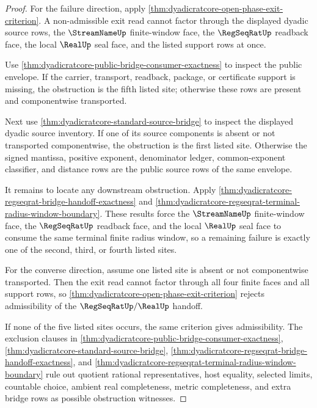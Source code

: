 \begin{proof}
For the failure direction, apply
\autoref{thm:dyadicratcore-open-phase-exit-criterion}. A non-admissible exit
read cannot factor through the displayed dyadic source rows, the
$\StreamNameUp$ finite-window face, the $\RegSeqRatUp$ readback face, the local
$\RealUp$ seal face, and the listed support rows at once.

Use \autoref{thm:dyadicratcore-public-bridge-consumer-exactness} to inspect the
public envelope. If the carrier, transport, readback, package, or certificate
support is missing, the obstruction is the fifth listed site; otherwise these
rows are present and componentwise transported.

Next use \autoref{thm:dyadicratcore-standard-source-bridge} to inspect the
displayed dyadic source inventory. If one of its source components is absent or
not transported componentwise, the obstruction is the first listed site.
Otherwise the signed mantissa, positive exponent, denominator ledger,
common-exponent classifier, and distance rows are the public source rows of the
same envelope.

It remains to locate any downstream obstruction. Apply
\autoref{thm:dyadicratcore-regseqrat-bridge-handoff-exactness} and
\autoref{thm:dyadicratcore-regseqrat-terminal-radius-window-boundary}. These
results force the $\StreamNameUp$ finite-window face, the $\RegSeqRatUp$
readback face, and the local $\RealUp$ seal face to consume the same terminal
finite radius window, so a remaining failure is exactly one of the second,
third, or fourth listed sites.

For the converse direction, assume one listed site is absent or not
componentwise transported. Then the exit read cannot factor through all four
finite faces and all support rows, so
\autoref{thm:dyadicratcore-open-phase-exit-criterion} rejects admissibility of
the $\RegSeqRatUp/\RealUp$ handoff.

If none of the five listed sites occurs, the same criterion gives
admissibility. The exclusion clauses in
\autoref{thm:dyadicratcore-public-bridge-consumer-exactness},
\autoref{thm:dyadicratcore-standard-source-bridge},
\autoref{thm:dyadicratcore-regseqrat-bridge-handoff-exactness}, and
\autoref{thm:dyadicratcore-regseqrat-terminal-radius-window-boundary} rule out
quotient rational representatives, host equality, selected limits, countable
choice, ambient real completeness, metric completeness, and extra bridge rows
as possible obstruction witnesses.
\end{proof}

